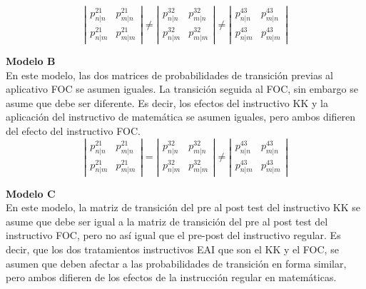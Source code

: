 $$\left|\begin{array}
{cc}{p_{n | n}^{21}} & {p_{m | n}^{21}} \\ {p_{n | m}^{21}} & {p_{m | m}^{21}}\end{array}\right| \neq\left|\begin{array}{cc}{p_{n | n}^{32}} & {p_{m | n}^{32}} \\ {p_{n | m}^{32}} & {p_{m | m}^{32}}\end{array}\right| \neq\left|\begin{array}{cc}{p_{n | n}^{43}} & {p_{m | n}^{43}} \\ {p_{n | m}^{43}} & {p_{m | m}^{43}}\end{array}\right|$$

\noindent
\textbf{Modelo B}\\
En este modelo, las dos matrices de probabilidades de transici\'{o}n previas al aplicativo FOC se asumen iguales. La transici\'{o}n seguida al FOC, sin embargo se asume que debe ser diferente. Es decir, los efectos del instructivo KK y la aplicaci\'{o}n del instructivo de matem\'{a}tica se asumen iguales, pero ambos difieren del efecto del instructivo FOC.\\

$$\left|\begin{array}
{cc}{p_{n | n}^{21}} & {p_{m | n}^{21}} \\ {p_{n | m}^{21}} & {p_{m | m}^{21}}\end{array}\right|=\left|\begin{array}{cc}{p_{n | n}^{32}} & {p_{m | n}^{32}} \\ {p_{n | m}^{32}} & {p_{m | m}^{32}}\end{array}\right| \neq\left|\begin{array}{cc}{p_{n | n}^{43}} & {p_{m | n}^{43}} \\ {p_{n | m}^{43}} & {p_{m | m}^{43}}\end{array}\right|$$

\noindent
\textbf{Modelo C}\\
En este modelo, la matriz de transici\'{o}n del pre al post test del instructivo KK se asume que debe ser igual a la matriz de transici\'{o}n del pre al post test del instructivo FOC, pero no as\'{i} igual que el pre-post del instructivo regular. Es decir, que los dos tratamientos instructivos EAI que son el KK y el FOC, se asumen que deben afectar a las probabilidades de transici\'{o}n en forma similar, pero ambos difieren de los efectos de la instrucci\'{o}n regular en matem\'{a}ticas.\\


